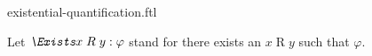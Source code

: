 \documentclass{stex}
\begin{document}
\begin{smodule}{existential-quantification.ftl}



\begin{fakeforthel}
  \begin{convention}
    Let $\emph{\Exists} x \mathrel{R} y : \varphi$ stand for there exists an $x \mathrel{R} y$ such that $\varphi$.
  \end{convention}
\end{fakeforthel}

\end{smodule}
\end{document}
